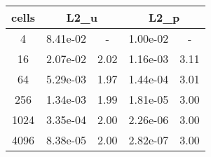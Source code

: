 \documentclass[10pt]{report}
\begin{document}
\begin{table}[H]
\begin{center}
\begin{tabular}{|c|c|c|c|c|} \hline
cells & 
\multicolumn{2}{|c|}{L2_u} & 
\multicolumn{2}{|c|}{L2_p}\\ \hline
4 & 8.41e-02 & - & 1.00e-02 & -\\ \hline
16 & 2.07e-02 & 2.02 & 1.16e-03 & 3.11\\ \hline
64 & 5.29e-03 & 1.97 & 1.44e-04 & 3.01\\ \hline
256 & 1.34e-03 & 1.99 & 1.81e-05 & 3.00\\ \hline
1024 & 3.35e-04 & 2.00 & 2.26e-06 & 3.00\\ \hline
4096 & 8.38e-05 & 2.00 & 2.82e-07 & 3.00\\ \hline
\end{tabular}
\end{center}
\end{table}
\end{document}

